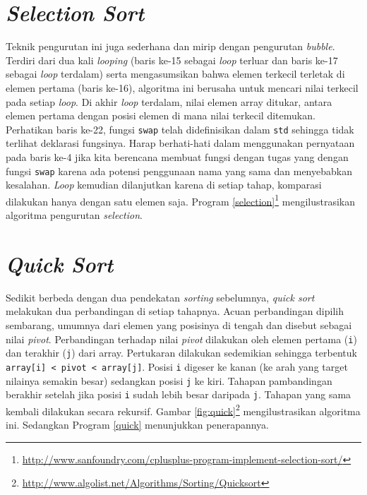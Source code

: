 \scriptsize

\normalsize

\section{\textit{Selection Sort}}
Teknik pengurutan ini juga sederhana dan mirip dengan pengurutan \textit{bubble}. Terdiri dari dua kali \textit{looping} (baris ke-15 sebagai \textit{loop} terluar dan baris ke-17 sebagai \textit{loop} terdalam) serta mengasumsikan bahwa elemen terkecil terletak di elemen pertama (baris ke-16), algoritma ini berusaha untuk mencari nilai terkecil pada setiap \textit{loop}. Di akhir \textit{loop} terdalam, nilai elemen array ditukar, antara elemen pertama dengan posisi elemen di mana nilai terkecil ditemukan. Perhatikan baris ke-22, fungsi \texttt{swap} telah didefinisikan dalam \texttt{std} sehingga tidak terlihat deklarasi fungsinya. Harap berhati-hati dalam menggunakan pernyataan pada baris ke-4 jika kita berencana membuat fungsi dengan tugas yang dengan fungsi \texttt{swap} karena ada potensi penggunaan nama yang sama dan menyebabkan kesalahan. \textit{Loop} kemudian dilanjutkan karena di setiap tahap, komparasi dilakukan hanya dengan satu elemen saja. Program \ref{selection}\footnote{\url{http://www.sanfoundry.com/cplusplus-program-implement-selection-sort/}} mengilustrasikan algoritma pengurutan \textit{selection}.

\scriptsize

\normalsize

\section{\textit{Quick Sort}}
Sedikit berbeda dengan dua pendekatan \textit{sorting} sebelumnya, \textit{quick sort} melakukan dua perbandingan di setiap tahapnya. Acuan perbandingan dipilih sembarang, umumnya dari elemen yang posisinya di tengah dan disebut sebagai nilai \textit{pivot}. Perbandingan terhadap nilai \textit{pivot} dilakukan oleh elemen pertama (\texttt{i}) dan terakhir (\texttt{j}) dari array. Pertukaran dilakukan sedemikian sehingga terbentuk \texttt{array[i] < pivot < array[j]}. Posisi \texttt{i} digeser ke kanan (ke arah yang target nilainya semakin besar) sedangkan posisi \texttt{j} ke kiri. Tahapan pambandingan berakhir setelah jika posisi \texttt{i} sudah lebih besar daripada \texttt{j}. Tahapan yang sama kembali dilakukan secara rekursif. Gambar \ref{fig:quick}\footnote{\url{http://www.algolist.net/Algorithms/Sorting/Quicksort}} mengilustrasikan algoritma ini. Sedangkan Program \ref{quick} menunjukkan penerapannya.

